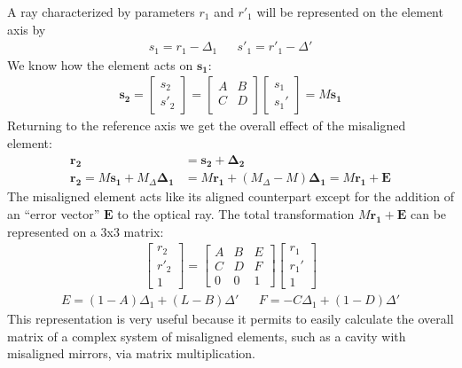 A ray characterized by parameters $r_1$ and $r'_1$ will be represented on the element axis by
\begin{align}
s_1 = r_1 - \Delta_1 && s'_1 = r'_1 - \Delta'
\end{align}
We know how the element acts on $\boldsymbol{s_1}$:
\begin{align}
\boldsymbol{s_2} =
\begin{bmatrix}
s_2 \\
s'_2
\end{bmatrix}
=
\begin{bmatrix}
A & B \\
C & D \\
\end{bmatrix}
\begin{bmatrix}
s_1 \\
s_1'
\end{bmatrix}
=M \boldsymbol{s_1}
\end{align}
Returning to the reference axis we get the overall effect of the misaligned element:
\begin{align}
\boldsymbol{r_2} &= \boldsymbol{s_2} + \boldsymbol{\Delta_2}\\
\boldsymbol{r_2} = M\boldsymbol{s_1} + M_\Delta \boldsymbol{\Delta_1} &= M\boldsymbol{r_1} + (M_\Delta - M)\boldsymbol{\Delta_1} = M\boldsymbol{r_1} + \boldsymbol{E}
\end{align}
The misaligned element acts like its aligned counterpart except for the addition of an ``error vector'' $\boldsymbol{E}$ to the optical ray.
The total transformation $M\boldsymbol{r_1}+\boldsymbol{E}$ can be represented on a 3x3 matrix:
\begin{align}
\begin{bmatrix}
r_2 \\
r'_2 \\
1
\end{bmatrix}
=
\begin{bmatrix}
A & B & E\\
C & D & F\\
0 & 0 & 1
\end{bmatrix}
\begin{bmatrix}
r_1 \\
r_1'\\
1
\end{bmatrix}
\label{eq:abcdef}
\end{align}
\begin{align}
E = (1-A)\Delta_1 + (L-B)\Delta' && F = -C\Delta_1 + (1-D)\Delta'
\end{align}
This representation is very useful because it permits to easily calculate the overall matrix of a complex system of misaligned elements, such as a cavity with misaligned mirrors, via matrix multiplication.

